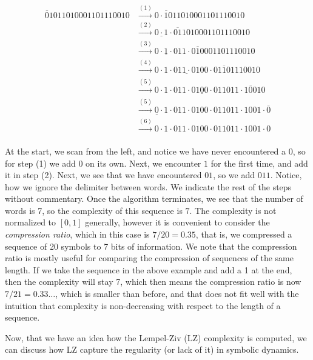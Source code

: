 \begin{align*}
\overline{0}1011010001101110010
&\xrightarrow{(1)}0\cdot\overline{1}011010001101110010 \\
&\xrightarrow{(2)}\underline{0\cdot1}\cdot\overline{01}1010001101110010 \\
&\xrightarrow{(3)}\underline{0\cdot1\cdot0}11\cdot\overline{010}001101110010 \\
&\xrightarrow{(4)}0\cdot1\cdot\underline{011\cdot01}00\cdot\overline{01101}110010 \\
&\xrightarrow{(5)}0\cdot1\cdot011\cdot0\underline{100}\cdot011011\cdot\overline{100}10 \\
&\xrightarrow{(5)}\underline{0}\cdot1\cdot011\cdot0100\cdot011011\cdot1001\cdot\overline{0} \\
&\xrightarrow{(6)}0\cdot1\cdot011\cdot0100\cdot011011\cdot1001\cdot0 \\
\end{align*}

At the start, we scan from the left, and notice we have never encountered a $0$, so for step (1) we add $0$ on its own. Next, we encounter $1$ for the first time, and add it in step (2). Next, we see that we have encountered $01$, so we add $011$. Notice, how we ignore the delimiter between words. We indicate the rest of the steps without commentary. Once the algorithm terminates, we see that the number of words is 7, so the complexity of this sequence is $7$. The complexity is not normalized to $[0,1]$ generally, however it is convenient to consider the \textit{compression ratio}, which in this case is $7/20=0.35$, that is, we compressed a sequence of 20 symbols to 7 bits of information. We note that the compression ratio is mostly useful for comparing the compression of sequences of the same length. If we take the sequence in the above example and add a 1 at the end, then the complexity will stay 7, which then means the compression ratio is now $7/21=0.33\dots$, which is smaller than before, and that does not fit well with the intuition that complexity is non-decreasing with respect to the length of a sequence.

Now, that we have an idea how the Lempel-Ziv (LZ) complexity is computed, we can discuss how LZ capture the regularity (or lack of it) in symbolic dynamics. 